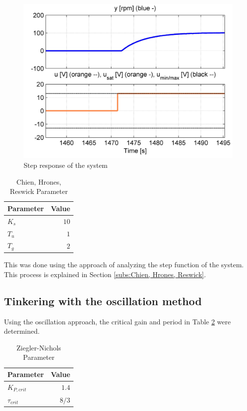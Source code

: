 \begin{figure}[H]
\begin{center}
\includegraphics[width=0.6\linewidth]{images/general/Step_Response}
\end{center}
\caption{Step response of the system}
\label{fig:step_response}
\end{figure}

\begin{table}[H]
\begin{center}
\begin{tabular}{ l | r}
  Parameter & Value\\
  \hline
  \hline
  $K_s$ & $10$\\
  \hline
  $T_u$ & $1$\\
  \hline
  $T_g$ & $2$\\
  \hline
\end{tabular}
\end{center}
\caption{Chien, Hrones, Reswick Parameter}
\label{tab:step_params}
\end{table}

This was done using the approach of analyzing the step function of the system. This process is explained in Section \ref{subs:Chien, Hrones, Reswick}.

\subsection{Tinkering with the oscillation method}

Using the oscillation approach, the critical gain and period in Table \ref{tab:osc_params} were determined.

\begin{table}[H]
\begin{center}
\begin{tabular}{ l | r}
  Parameter & Value\\
  \hline
  \hline
  $K_{P,crit}$ & $1.4$\\
  \hline
  $\tau_{crit}$ & $8/3$\\
  \hline
\end{tabular}
\end{center}
\caption{Ziegler-Nichols Parameter}
\label{tab:osc_params}
\end{table}

